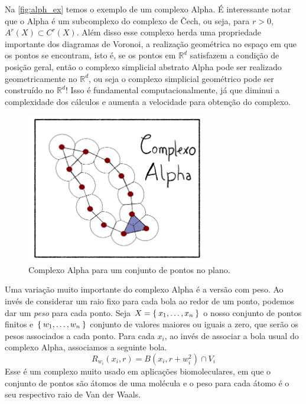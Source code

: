 Na \autoref{fig:alph_ex} temos o exemplo de um complexo Alpha. É interessante
notar que o Alpha é um subcomplexo do complexo de \v{C}ech, ou seja,
para $r > 0$, $A^r(X) \subset C^r(X)$. Além disso esse complexo herda uma propriedade
importante dos diagramas de Voronoi, a realização geométrica no espaço em que os pontos
se encontram, isto é, se os pontos em $\mathbb{R}^d$ satisfazem a condição de
posição geral, então o complexo simplicial abstrato Alpha pode ser
realizado geometricamente no $\mathbb{R}^d$, ou seja o complexo simplicial geométrico pode ser construído
no $\mathbb{R}^d$! Isso é fundamental computacionalmente, já que diminui a complexidade dos cálculos e aumenta a velocidade para obtenção do complexo.

\begin{figure}[!htpb]
  \centering
  \includegraphics[width=0.7\textwidth]{images/ComplexAlpha.png}
  \caption{Complexo Alpha para um conjunto de pontos no plano.}
  \label{fig:alph_ex}
  \fautor
\end{figure}

Uma variação muito importante do complexo Alpha é a versão com peso. Ao invés
de considerar um raio fixo para cada bola ao redor de um ponto, podemos dar
um \textit{peso} para cada ponto. Seja $X=\Set{x_1, \dots, x_n}$ o nosso
conjunto de pontos finitos e $\Set{w_1, \dots, w_n}$ conjunto de valores
maiores ou iguais a zero, que serão os pesos associados a cada ponto. Para
cada $x_i$, ao invés de associar a bola usual do complexo Alpha, associamos
a seguinte bola.
\begin{equation*}
  R_{w_i}(x_i, r) = B(x_i, r + w_i^2) \cap V_i
\end{equation*}
Esse é um complexo muito usado em aplicações biomoleculares, em que o conjunto de pontos
são átomos de uma molécula e o peso para cada átomo é o seu respectivo raio de
Van der Waals.


